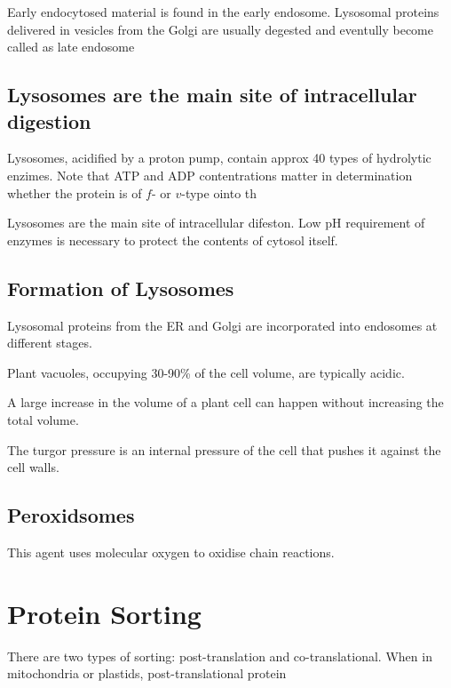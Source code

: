 \documentclass[11pt]{scrartcl}
\begin{document}


Early endocytosed material is found in the early endosome. Lysosomal proteins delivered in vesicles from the Golgi are usually degested and eventully become called as late endosome

\subsection{Lysosomes are the main site of intracellular digestion}

Lysosomes, acidified by a proton pump, contain approx 40 types of hydrolytic enzimes. Note that ATP and ADP contentrations matter in determination whether the protein is of $f$- or $v$-type ointo th

Lysosomes are the main site of intracellular difeston. Low pH requirement of enzymes is necessary to protect the contents of cytosol itself.

\subsection{Formation of Lysosomes}

Lysosomal proteins from the ER and Golgi are incorporated into endosomes at different stages.

Plant vacuoles, occupying 30-90\% of the cell volume,  are typically acidic.

A large increase in the volume of a plant cell can happen without increasing the total volume.

The turgor pressure is an internal pressure of the cell that pushes it against  the cell walls.

\subsection{Peroxidsomes}

This agent uses molecular oxygen to oxidise chain reactions.

\section{Protein Sorting}

There are two types of sorting: post-translation and co-translational. When in mitochondria or plastids, post-translational protein
\end{document}
